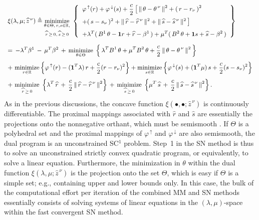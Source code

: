 \documentclass{siamart}
\newcommand{\wh}{\widehat}
\begin{document}
\[ %
{\small \begin{array}{l}
\xi(\lambda,\mu;\wh{z}^{\,\nu})  \triangleq
\displaystyle\operatornamewithlimits{\mbox{minimize}}_{\substack{
\theta\in \Theta, \, r,  s\in\mathbb{R},\\[0.05in]
 \wh{r}\,\geq\, 0,\, \wh{s}\,\geq \,0}} \; \left\{\begin{array}{ll}
\varphi^{\,\uparrow}(r)  + \varphi^{\,\downarrow}(s) + \displaystyle\frac{c}{2}\,\big[\,\|\,\theta-\theta^{\,\nu}\,\|^2 +(\, r - r_{\nu} \, )^2 \\[0.1in]
+(\, s - s_{\nu} \, )^2
+  \|\,\wh{r} - \wh{r}^{\,\nu}\,\|^2
+ \|\,\wh{s} - \wh{s}^{\,\nu}\,\|^2 \,\big]\\[0.1in]
+\lambda^T(\,B^1\,\theta-\mathbf{1}r + \wh{r}-\beta^1\,)+\mu^T(\,B^2\,\theta + \mathbf{1}s + \wh{s}-\beta^2\,)
\end{array}\right\}\\[0.4in]
 = \, - \lambda^T\beta^1 \,-\, \mu^T\beta^2 \, +\,
\displaystyle\operatornamewithlimits{\mbox{minimize}}_{\theta\in \Theta} \; \left\{\,\lambda^TB^1\,\theta + \mu^T B^2\,\theta
+ \frac{c}{2}\,\|\,\theta-\theta^{\,\nu}\,\|^2\,\right\} \\[0.15in]
 + \, \displaystyle\operatornamewithlimits{\mbox{minimize}}_{r\in \mathbb{R}} \left\{ \varphi^{\,\uparrow}(r)-(\mathbf{1}^T \lambda)\,
r+\frac{c}{2}( r - r_{\nu}  )^2\right\}  + \displaystyle \operatornamewithlimits{\mbox{minimize}}_{s\in \mathbb{R}} \left\{\varphi^{\,\downarrow}(s)+(\mathbf{1}^T\mu)\,s+\frac{c}{2}( s - s_{\nu} )^2\right\}
\\[0.15in]
+ \,\displaystyle\operatornamewithlimits{\mbox{minimize}}_{\wh{r}\,\geq \,0}\; \left\{\lambda^T\,\wh{r}\,+\,\frac{c}{2}\,\|\,\wh{r}-\wh{r}^{\,\nu}\,\|^2\right\} \, +\,
\displaystyle \operatornamewithlimits{\mbox{minimize}}_{\wh{s}\,\geq \,0}\; \left\{\mu^T\,\wh{s}\,+\,\frac{c}{2}\,\|\,\wh{s}-\wh{s}^{\,\nu}\,\|^2\right\}.
\end{array}}
\] %
As in the previous discussions, the concave function $\xi(\bullet,\bullet;\wh{z}^{\, \nu})$ is continuously differentiable.
The proximal mappings associated with $\wh{r}$ and $\wh{s}$ are essentially the projections onto the nonnegative orthant, which must be
semismooth \cite[Theorem~4.5.2 \& Proposition~7.4.6]{FacchineiPang2003}.
If $\Theta$ is a polyhedral set and the proximal mappings of $\varphi^{\,\uparrow}$ and $\varphi^{\,\downarrow}$ are also semismooth,
the dual program is  an unconstrained SC$^1$ problem.  Step~1 in the SN method is thus to solve an unconstrained strictly convex quadratic program,
or equivalently, to solve a linear equation.  Furthermore, the minimization in $\theta$ within the dual function $\xi(\lambda,\mu;\wh{z}^{\,\nu})$ is the projection
onto the set $\Theta$, which is easy if $\Theta$ is a simple set; e.g., containing upper and lower bounds only.  In this case, the bulk of the
computational effort per iteration of the combined MM and SN methods %
essentially consists of solving systems of linear equations in the $(\lambda,\mu)$-space within the fast convergent SN method.
\end{document}
